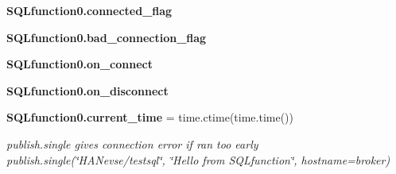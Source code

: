 \begin{DoxyCompactItemize}
\textbf{ S\+Q\+Lfunction0.\+connected\+\_\+flag}
\item 
\textbf{ S\+Q\+Lfunction0.\+bad\+\_\+connection\+\_\+flag}
\item 
\textbf{ S\+Q\+Lfunction0.\+on\+\_\+connect}
\item 
\textbf{ S\+Q\+Lfunction0.\+on\+\_\+disconnect}
\item 
\textbf{ S\+Q\+Lfunction0.\+current\+\_\+time} = time.\+ctime(time.\+time())
\begin{DoxyCompactList}\small\item\em publish.\+single gives connection error if ran too early publish.\+single(\char`\"{}\+H\+A\+Nevse/testsql\char`\"{}, \char`\"{}\+Hello from S\+Q\+Lfunction\char`\"{}, hostname=broker) \end{DoxyCompactList}\end{DoxyCompactItemize}
